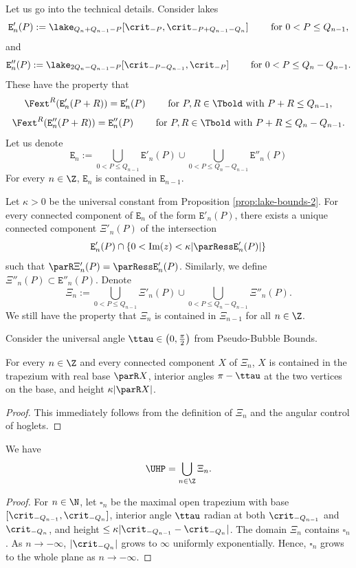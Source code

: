 \documentclass{amsart}
\begin{document}
Let us go into the technical details.
Consider lakes
\[
    \mathtt{E}'_n(P) := \lake_{Q_n+Q_{n-1}-P}[\crit_{-P}, \crit_{-P+Q_{n-1}-Q_n}] \qquad \text{ for } 0 < P \leq Q_{n-1},
\]
and
\[
    \mathtt{E}''_n(P) := \lake_{2Q_n-Q_{n-1}-P}[\crit_{-P-Q_{n-1}}, \crit_{-P}] \qquad \text{ for } 0 < P \leq Q_n - Q_{n-1}.
\]
These have the property that
\[
    \Fext^R(\mathtt{E}'_n(P+R)) = \mathtt{E}'_n(P) \qquad \text{ for } P,R \in \Tbold \text{ with } P+R \leq Q_{n-1},
\]
\[
    \Fext^R(\mathtt{E}''_n(P+R)) = \mathtt{E}''_n(P) \qquad \text{ for } P,R \in \Tbold \text{ with } P+R \leq Q_{n} - Q_{n-1}.
\]
Let us denote
\[
    \mathtt{E}_n := \bigcup_{0 < P \leq Q_{n-1}} \mathtt{E}'_n(P) \cup \bigcup_{0 < P \leq Q_{n}-Q_{n-1}} \mathtt{E}''_n(P)
\]
For every $n \in \Z$, $\mathtt{E}_n$ is contained in $\mathtt{E}_{n-1}$.

Let $\kappa >0$ be the universal constant from Proposition \ref{prop:lake-bounds-2}.
For every connected component of $\mathtt{E}_n$ of the form $\mathtt{E}'_n(P)$, there exists a unique connected component $\Xi'_n(P)$ of the intersection
\[
    \mathtt{E}'_n(P) \cap \left\{ 0 < \textnormal{Im}(z) < \kappa |\parRess \mathtt{E}'_n(P)| \right\}
\]
such that $\parR \Xi'_n(P) = \parRess \mathtt{E}'_n(P)$.
Similarly, we define $\Xi''_n(P) \subset \mathtt{E}''_n(P)$.
Denote
\[
    \Xi_n := \bigcup_{0 < P \leq Q_{n-1}} \Xi'_n(P) \cup \bigcup_{0 < P \leq Q_{n}-Q_{n-1}} \Xi''_n(P).
\]
We still have the property that $\Xi_n$ is contained in $\Xi_{n-1}$ for all $n \in \Z$.

Consider the universal angle $\ttau \in \left( 0, \frac{\pi}{2} \right)$ from Pseudo-Bubble Bounds.

\begin{lemma}
    \label{lem:estimate-Yn}
    For every $n \in \Z$ and every connected component $X$ of $\Xi_n$, $X$ is contained in the trapezium with real base $\parR X$, interior angles $\pi - \ttau$ at the two vertices on the base, and height $\kappa |\parR X|$.
\end{lemma}

\begin{proof}
    This immediately follows from the definition of $\Xi_n$ and the angular control of hoglets.
\end{proof}

\begin{lemma}
    We have
    \[
        \UHP = \bigcup_{n \in \Z} \Xi_n.
    \]
\end{lemma}

\begin{proof}
    For $n \in \N$, let $\square_n$ be the maximal open trapezium with base $[\crit_{-Q_{n-1}},\crit_{-Q_n}]$, interior angle $\ttau$ radian at both $\crit_{-Q_{n-1}}$ and $\crit_{-Q_n}$, and height $\leq \kappa |\crit_{-Q_{n-1}} - \crit_{-Q_n}|$.
    The domain $\Xi_n$ contains $\square_n$.
    As $n \to -\infty$, $|\crit_{-Q_n}|$ grows to $\infty$ uniformly exponentially.
    Hence, $\square_n$ grows to the whole plane as $n \to -\infty$.
\end{proof}
\end{document}
